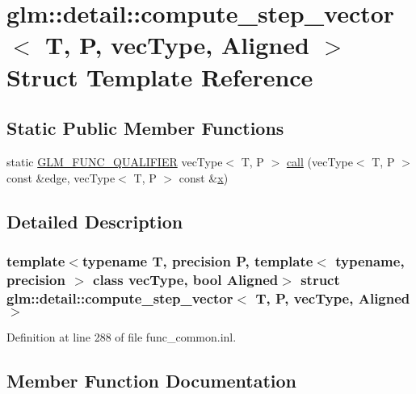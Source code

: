 \hypertarget{structglm_1_1detail_1_1compute__step__vector}{}\section{glm\+::detail\+::compute\+\_\+step\+\_\+vector$<$ T, P, vec\+Type, Aligned $>$ Struct Template Reference}
\label{structglm_1_1detail_1_1compute__step__vector}
\subsection*{Static Public Member Functions}
\begin{DoxyCompactItemize}
\item 
static \mbox{\hyperlink{setup_8hpp_a33fdea6f91c5f834105f7415e2a64407}{G\+L\+M\+\_\+\+F\+U\+N\+C\+\_\+\+Q\+U\+A\+L\+I\+F\+I\+ER}} vec\+Type$<$ T, P $>$ \mbox{\hyperlink{structglm_1_1detail_1_1compute__step__vector_a4ee392cb63cb279a55f5ca3cb5d4a392}{call}} (vec\+Type$<$ T, P $>$ const \&edge, vec\+Type$<$ T, P $>$ const \&\mbox{\hyperlink{glad_8h_a92d0386e5c19fb81ea88c9f99644ab1d}{x}})
\end{DoxyCompactItemize}


\subsection{Detailed Description}
\subsubsection*{template$<$typename T, precision P, template$<$ typename, precision $>$ class vec\+Type, bool Aligned$>$\newline
struct glm\+::detail\+::compute\+\_\+step\+\_\+vector$<$ T, P, vec\+Type, Aligned $>$}



Definition at line 288 of file func\+\_\+common.\+inl.



\subsection{Member Function Documentation}
\mbox{\label{structglm_1_1detail_1_1compute__step__vector_a4ee392cb63cb279a55f5ca3cb5d4a392}} 
